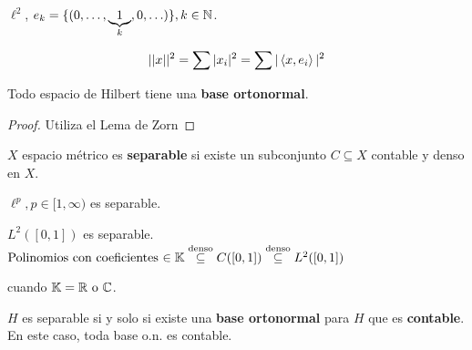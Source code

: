\begin{fexample}
    $\ell^2$, $e_k=\{(0,\ldots,\underbrace{1}_k,0,\ldots)\},k\in\mathbb{N}$.

    \[||x||^2=\sum |x_i|^2=\sum |\left\langle x,e_i\right\rangle|^2\]
\end{fexample}

\begin{ftheorem}
    Todo espacio de Hilbert tiene una \textbf{base ortonormal}.
\end{ftheorem}

\begin{proof}
    Utiliza el Lema de Zorn
\end{proof}

\begin{fdefinition}
    $X$ espacio métrico es \textbf{separable} si existe un subconjunto $C\subseteq X$ contable y denso en $X$.
\end{fdefinition}

\begin{fexample}
    $\ell^p,p\in [1,\infty)$ es separable. 

    $L^2([0,1])$ es separable. $\text{Polinomios con coeficientes $\in\mathbb{K}$}\overset{\text{denso}}{\subseteq}C([0,1])\overset{\text{denso}}{\subseteq} L^2([0,1])$

     cuando $\mathbb{K}=\mathbb{R} \text{ o } \mathbb{C}$.
\end{fexample}

\begin{ftheorem}
    $H$ es separable si y solo si existe una \textbf{base ortonormal} para $H$ que es \textbf{contable}. En este caso, toda base o.n. es contable.
\end{ftheorem}

